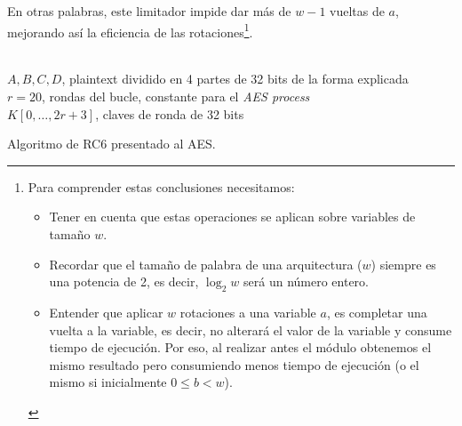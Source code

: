 \begin{itemize}
	En otras palabras, este limitador impide dar más de $w-1$ vueltas de $a$, mejorando así la eficiencia de las rotaciones\footnote{Para comprender estas conclusiones necesitamos:
	\begin{itemize}
		\item Tener en cuenta que estas operaciones se aplican sobre variables de tamaño $w$.
		\item Recordar que el tamaño de palabra de una arquitectura ($w$) siempre es una potencia de 2, es decir, $\log_2 w$ será un número entero.
		\item Entender que aplicar $w$ rotaciones a una variable $a$, es completar una vuelta a la variable, es decir, no alterará el valor de la variable y consume tiempo de ejecución. Por eso, al realizar antes el módulo obtenemos el mismo resultado pero consumiendo menos tiempo de ejecución (o el mismo si inicialmente $0 \leq b < w$).
	\end{itemize}}.
\end{itemize}

\begin{algorithm}[H]
	\begin{algorithmic}[1]
		\small
		\REQUIRE \ \\
			\texttt{$A, B, C, D$}, plaintext dividido en 4 partes de 32 bits de la forma explicada\\
			\texttt{$r = 20$}, rondas del bucle, constante para el \textit{AES process} \\
			\texttt{$K [0, \dots, 2r + 3]$}, claves de ronda de 32 bits\\
		
		
		\ENDFOR
		
	\end{algorithmic}

	\caption{Algoritmo de RC6 presentado al AES.}
	\label{alg:RC6}
\end{algorithm}


